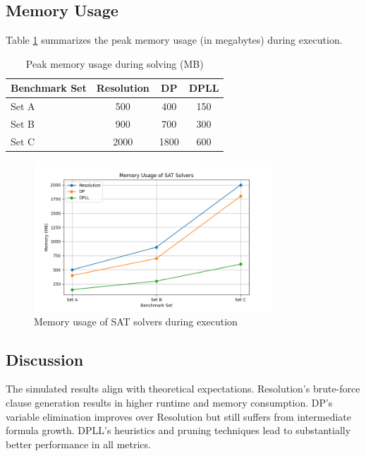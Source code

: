\documentclass{article}
\begin{document}
\subsection{Memory Usage}

Table \ref{tab:memory-usage} summarizes the peak memory usage (in megabytes) during execution.

\begin{table}[h]
\centering
\begin{tabular}{lccc}
\hline
\textbf{Benchmark Set} & \textbf{Resolution} & \textbf{DP} & \textbf{DPLL} \\
\hline
Set A & 500 & 400 & 150 \\
Set B & 900 & 700 & 300 \\
Set C & 2000 & 1800 & 600 \\
\hline
\end{tabular}
\caption{Peak memory usage during solving (MB)}
\label{tab:memory-usage}
\end{table}

\begin{figure}[h]
\centering
\includegraphics[width=0.8\textwidth]{memory_usage.png}
\caption{Memory usage of SAT solvers during execution}
\label{fig:memory-usage}
\end{figure}

\subsection{Discussion}

The simulated results align with theoretical expectations. Resolution's brute-force clause generation results in higher runtime and memory consumption. DP's variable elimination improves over Resolution but still suffers from intermediate formula growth. DPLL’s heuristics and pruning techniques lead to substantially better performance in all metrics.
\end{document}
